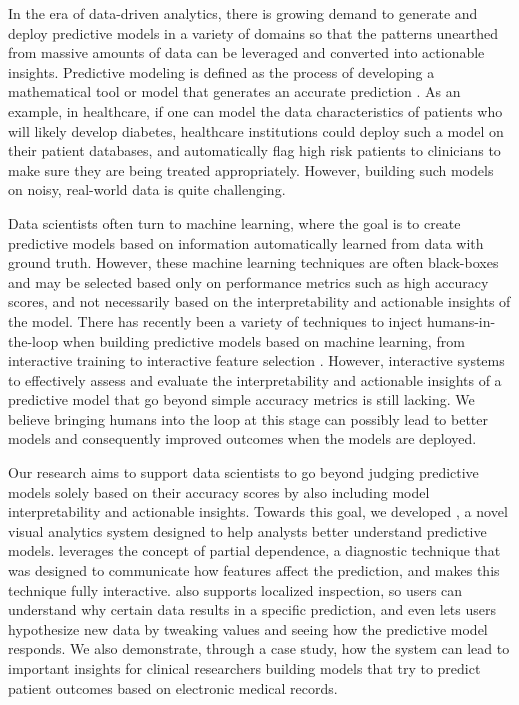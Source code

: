 

In the era of data-driven analytics, there is growing demand to generate and deploy predictive models in a variety of domains so that the patterns unearthed from massive amounts of data can be leveraged
and converted into actionable insights.
Predictive modeling is defined as the process of developing a mathematical tool or model that generates an accurate prediction \cite{kuhn2013applied}.  As an example, in healthcare, if one can model the data characteristics of patients who will likely develop diabetes, healthcare institutions could deploy such a model on their patient databases, and automatically flag high risk patients to clinicians to make sure they are being treated appropriately.  However, building such models on noisy, real-world data is quite challenging.  

Data scientists often turn to machine learning, where the goal is to create predictive models based on information automatically learned from data with ground truth.  However, these machine learning techniques are often black-boxes and may be selected based only on performance metrics such as high accuracy scores, and not necessarily based on the interpretability and actionable insights of the model.  There has recently been a variety of techniques to inject humans-in-the-loop when building predictive models based on machine learning, from interactive training \cite{amershi15} to interactive feature selection \cite{infuse}.  However, interactive systems to effectively assess and evaluate the interpretability and actionable insights of a predictive model that go beyond simple accuracy metrics is still lacking.  We believe bringing humans into the loop at this stage can possibly lead to better models and consequently improved outcomes when the models are deployed.

Our research aims to support data scientists to go beyond judging predictive models solely based on their accuracy scores by also including model interpretability and actionable insights.  Towards this goal, we developed \prospector, a novel visual analytics system designed to help analysts better understand  predictive models.  \prospector leverages the concept of partial dependence, a diagnostic technique that was designed to communicate how features affect the prediction, and makes this technique fully interactive.  \prospector also supports localized inspection, so users can understand why certain data results in a specific prediction, and even lets users hypothesize new data by tweaking values and seeing how the predictive model responds.  We also demonstrate, through a case study, how the system can lead to important insights for clinical researchers building models that try to predict patient outcomes based on electronic medical records.

